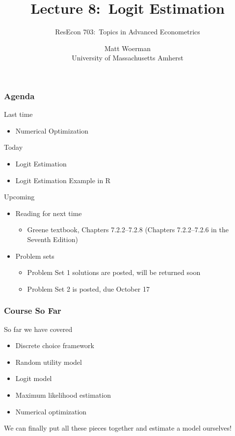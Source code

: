 \documentclass{beamer}\usepackage[]{graphicx}\usepackage[]{color}
\title[Lecture 8:\ Logit Estimation]{Lecture 8:\ Logit Estimation}
\author[ResEcon 703:\ Advanced Econometrics]{ResEcon 703:\ Topics in Advanced Econometrics}
\date{Matt Woerman\\University of Massachusetts Amherst}
\begin{document}
{ 
\begin{frame}[noframenumbering]
    \titlepage
\end{frame}
}

\begin{frame}\frametitle{Agenda}
    Last time
    \begin{itemize}
        \item Numerical Optimization
    \end{itemize}
    \vspace{2ex}
    Today
    \begin{itemize}
    	\item Logit Estimation
    	\item Logit Estimation Example in R
    \end{itemize}
    \vspace{2ex}
    Upcoming
    \begin{itemize}
        \item Reading for next time
        \begin{itemize}
            \item Greene textbook, Chapters 7.2.2--7.2.8 (Chapters 7.2.2--7.2.6 in the Seventh Edition)
        \end{itemize}
        \item Problem sets
        \begin{itemize}
        	\item Problem Set 1 solutions are posted, will be returned soon
            \item Problem Set 2 is posted, due October 17
        \end{itemize}
    \end{itemize}
\end{frame}

\begin{frame}\frametitle{Course So Far}
    So far we have covered
    \begin{itemize}
    	\item Discrete choice framework
    	\item Random utility model
    	\item Logit model
    	\item Maximum likelihood estimation
    	\item Numerical optimization
    \end{itemize}
    \vspace{3ex}
    We can finally put all these pieces together and estimate a model ourselves!
\end{frame}
\end{document}
